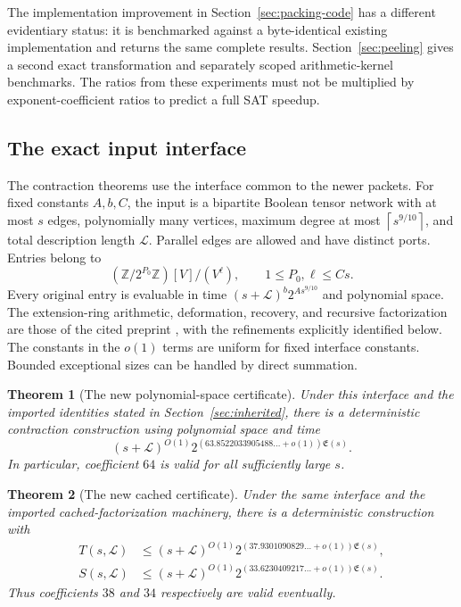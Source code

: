 \documentclass[11pt,letterpaper]{article}
\newtheorem{theorem}{Theorem}[section]
\theoremstyle{remark}\newtheorem{remark}[theorem]{Remark}
\newcommand{\ceil}[1]{\left\lceil#1\right\rceil}
\begin{document}
The implementation improvement in Section~\ref{sec:packing-code} has a
different evidentiary status: it is benchmarked against a byte-identical
existing implementation and returns the same complete results.
Section~\ref{sec:peeling} gives a second exact transformation and separately
scoped arithmetic-kernel benchmarks. The ratios from these experiments
must not be multiplied by exponent-coefficient ratios to predict a full
SAT speedup.

\subsection{The exact input interface}

The contraction theorems use the interface common to the newer packets.
For fixed constants $A,b,C$, the input is a bipartite Boolean tensor
network with at most $s$ edges, polynomially many vertices, maximum degree
at most $\ceil{s^{9/10}}$, and total description length $\mathcal L$.
Parallel edges are allowed and have distinct ports. Entries belong to
\[
 (\mathbb Z/2^{P_0}\mathbb Z)[V]/(V^\ell),\qquad
 1\le P_0,\ell\le Cs.
\]
Every original entry is evaluable in time
$(s+\mathcal L)^b2^{A s^{9/10}}$ and polynomial space. The extension-ring
arithmetic, deformation, recovery, and recursive factorization are those
of the cited preprint \cite{upstream}, with the refinements explicitly
identified below. The constants in the $o(1)$ terms are uniform for fixed
interface constants. Bounded exceptional sizes can be handled by direct
summation.

\begin{theorem}[The new polynomial-space certificate]\label{thm:ps}
Under this interface and the imported identities stated in
Section~\ref{sec:inherited}, there is a deterministic contraction
construction using polynomial space and time
\[
 (s+\mathcal L)^{O(1)}
 2^{(63.8522033905488\ldots+o(1))\mathfrak E(s)}.
\]
In particular, coefficient $64$ is valid for all sufficiently large $s$.
\end{theorem}

\begin{theorem}[The new cached certificate]\label{thm:cached}
Under the same interface and the imported cached-factorization machinery,
there is a deterministic construction with
\begin{align*}
 T(s,\mathcal L)&\le(s+\mathcal L)^{O(1)}
       2^{(37.9301090829\ldots+o(1))\mathfrak E(s)},\\
 S(s,\mathcal L)&\le(s+\mathcal L)^{O(1)}
       2^{(33.6230409217\ldots+o(1))\mathfrak E(s)}.
\end{align*}
Thus coefficients $38$ and $34$ respectively are valid eventually.
\end{theorem}
\end{document}
